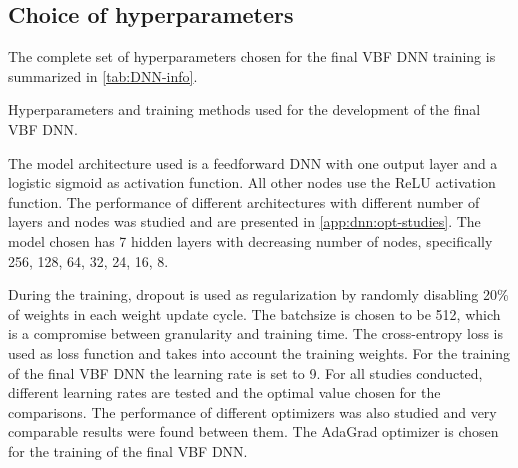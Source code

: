 \subsection{Choice of hyperparameters}
\label{subsec:hyper-parameters}
The complete set of hyperparameters chosen for the final VBF DNN training is summarized in \cref{tab:DNN-info}. 
\begin{table}[t]
    \begin{center}
        
    \end{center}
    \caption[Hyperparameters and training methods for the VBF DNN.]{Hyperparameters and training methods used for the development of the final VBF DNN.
    }
    \label{tab:DNN-info}
\end{table}
The model architecture used is a feedforward DNN with one output layer and a logistic sigmoid as activation function. All other nodes use the ReLU activation function.
The performance of different architectures with different number of layers and nodes was studied and are presented in \cref{app:dnn:opt-studies}.
The model chosen has 7 hidden layers with decreasing number of nodes, specifically {256, 128, 64, 32, 24, 16, 8}.

During the training, dropout is used as regularization by randomly disabling 20\% of weights in each weight update cycle.
The batchsize is chosen to be 512, which is a compromise between granularity and training time.
The cross-entropy loss is used as loss function and takes into account the training weights.
For the training of the final VBF DNN the learning rate is set to 9. For all studies conducted, different learning rates are tested and the optimal value chosen for the comparisons. 
The performance of different optimizers was also studied and very comparable results were found between them.
The AdaGrad optimizer is chosen for the training of the final VBF DNN.

